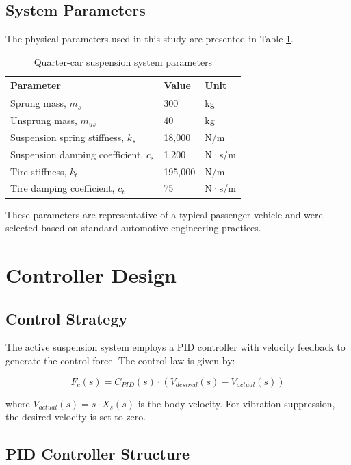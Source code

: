 \documentclass[12pt,a4paper]{article}
\begin{document}
\subsection{System Parameters}

The physical parameters used in this study are presented in Table \ref{tab:parameters}.

\begin{table}[H]
\centering
\caption{Quarter-car suspension system parameters}
\label{tab:parameters}
\begin{tabular}{@{}lll@{}}
\toprule
\textbf{Parameter} & \textbf{Value} & \textbf{Unit} \\ \midrule
Sprung mass, $m_s$ & 300 & kg \\
Unsprung mass, $m_{us}$ & 40 & kg \\
Suspension spring stiffness, $k_s$ & 18,000 & N/m \\
Suspension damping coefficient, $c_s$ & 1,200 & N·s/m \\
Tire stiffness, $k_t$ & 195,000 & N/m \\
Tire damping coefficient, $c_t$ & 75 & N·s/m \\ \bottomrule
\end{tabular}
\end{table}

These parameters are representative of a typical passenger vehicle and were selected based on standard automotive engineering practices.

\section{Controller Design}

\subsection{Control Strategy}
The active suspension system employs a PID controller with velocity feedback to generate the control force. The control law is given by:

\begin{equation}
    F_c(s) = C_{PID}(s) \cdot \left( V_{desired}(s) - V_{actual}(s) \right)
    \label{eq:control_law}
\end{equation}

where $V_{actual}(s) = s \cdot X_s(s)$ is the body velocity. For vibration suppression, the desired velocity is set to zero.

\subsection{PID Controller Structure}
\end{document}
